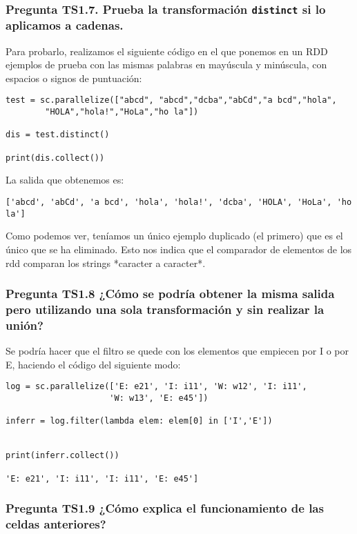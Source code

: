 \documentclass[11pt]{article}
\def\inline{\lstinline[basicstyle=\ttfamily,keywordstyle={}]}
\begin{document}
\subsubsection*{ Pregunta TS1.7. Prueba la transformación \inline{distinct} si lo aplicamos a cadenas.}

Para probarlo, realizamos el siguiente código en el que ponemos en un RDD ejemplos de prueba con las mismas palabras en mayúscula y minúscula, con espacios o signos de puntuación:

\begin{verbatim}
test = sc.parallelize(["abcd", "abcd","dcba","abCd","a bcd","hola",
        "HOLA","hola!","HoLa","ho la"])

dis = test.distinct()

print(dis.collect())
\end{verbatim}
La salida que obtenemos es:

\begin{verbatim}
['abcd', 'abCd', 'a bcd', 'hola', 'hola!', 'dcba', 'HOLA', 'HoLa', 'ho la']
\end{verbatim}

Como podemos ver, teníamos un único ejemplo duplicado (el primero) que es el único que se ha eliminado. Esto nos indica que el comparador de elementos de los rdd comparan los strings *caracter a caracter*.

\subsubsection*{ Pregunta TS1.8 ¿Cómo se podría obtener la misma salida pero utilizando una sola transformación y sin realizar la unión?}


Se podría hacer que el filtro se quede con los elementos que empiecen por I o por E, haciendo el código del siguiente modo:

\begin{verbatim}
log = sc.parallelize(['E: e21', 'I: i11', 'W: w12', 'I: i11',
                     'W: w13', 'E: e45'])

inferr = log.filter(lambda elem: elem[0] in ['I','E'])


print(inferr.collect())

'E: e21', 'I: i11', 'I: i11', 'E: e45']

\end{verbatim}
\subsubsection*{ Pregunta TS1.9 ¿Cómo explica el funcionamiento de las celdas anteriores?}
\end{document}
